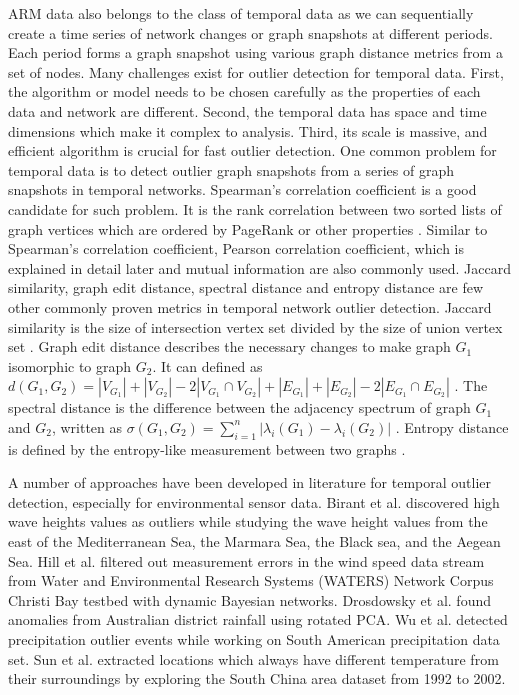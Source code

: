 ARM data also belongs to the class of temporal data as we can sequentially create a
time series of network changes or graph snapshots at different periods.
Each period forms a graph snapshot using various graph distance metrics
from a set of nodes. Many challenges exist for outlier detection for
temporal data. First, the algorithm or model needs to be chosen
carefully as the properties of each data and network are different.
Second, the temporal data has space and time dimensions which make it
complex to analysis. Third, its scale is massive, and efficient algorithm
is crucial for fast outlier detection. One common problem for temporal
data is to detect outlier graph snapshots from a series of graph snapshots
in temporal networks. Spearman's correlation coefficient is a good
candidate for such problem. It is the rank correlation between two
sorted lists of graph vertices which are ordered by PageRank or other
properties \cite{papadimitriou2010web}. Similar to Spearman's
correlation coefficient, Pearson correlation coefficient, which is explained 
in detail later and mutual information are also commonly used. 
Jaccard similarity, graph edit distance, spectral distance and entropy 
distance are few other commonly proven metrics in temporal network outlier detection.
Jaccard similarity is the size of intersection vertex set
divided by the size of union vertex set \cite{jay2012systematic}. Graph
edit distance describes the necessary changes to make graph $G_1$
isomorphic to graph $G_2$. It can defined as $d(G_1, G_2) = |V_{G_1}| +
|V_{G_2}| - 2|V_{G_1} \cap V_{G_2}| + |E_{G_1}| + |E_{G_2}| - 2|E_{G_1}
\cap E_{G_2}|$ \cite{papadimitriou2010web}. The spectral distance is the
difference between the adjacency spectrum of graph $G_1$ and $G_2$,
written as $\sigma(G_1, G_2) =
\displaystyle\sum_{i=1}^{n}|\lambda_i(G_1) - \lambda_i(G_2)|$
\cite{jovanovic2012spectral}. Entropy distance is defined by
the entropy-like measurement between two graphs
\cite{pincombe2005anomaly}.

A number of approaches have been developed in literature for temporal outlier detection,
especially for environmental sensor data. Birant et al.
\cite{kut2006spatio} discovered high wave heights values as outliers 
while studying the wave height values from the east of
the Mediterranean Sea, the Marmara Sea, the Black sea, and the
Aegean Sea. Hill et al. \cite{hill2007real, hill2010anomaly}
filtered out measurement errors in the wind speed data stream from
Water and Environmental Research Systems (WATERS) Network Corpus
Christi Bay testbed with dynamic Bayesian networks. Drosdowsky et
al. \cite{drosdowsky1993analysis} found anomalies from Australian
district rainfall using rotated PCA. Wu et al. \cite{wu2010spatio}
detected precipitation outlier events while working on South
American precipitation data set. Sun et al.
\cite{yuxiang2005detecting} extracted locations which always have
different temperature from their surroundings by exploring the
South China area dataset from 1992 to 2002.

